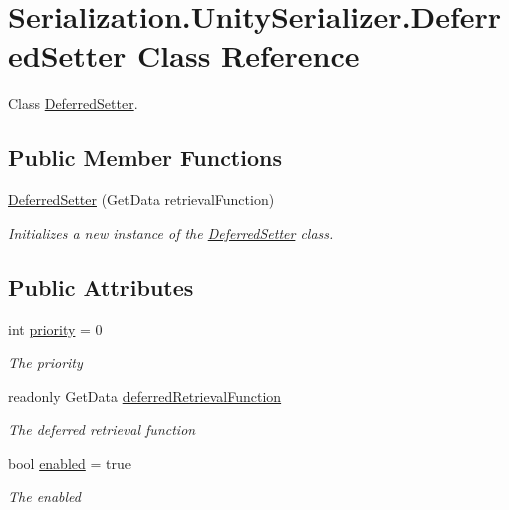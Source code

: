 \hypertarget{class_serialization_1_1_unity_serializer_1_1_deferred_setter}{}\section{Serialization.\+Unity\+Serializer.\+Deferred\+Setter Class Reference}
\label{class_serialization_1_1_unity_serializer_1_1_deferred_setter}


Class \hyperlink{class_serialization_1_1_unity_serializer_1_1_deferred_setter}{Deferred\+Setter}.  


\subsection*{Public Member Functions}
\begin{DoxyCompactItemize}
\item 
\hyperlink{class_serialization_1_1_unity_serializer_1_1_deferred_setter_a5a4ece5260d24868a8beb674ada150dd}{Deferred\+Setter} (Get\+Data retrieval\+Function)
\begin{DoxyCompactList}\small\item\em Initializes a new instance of the \hyperlink{class_serialization_1_1_unity_serializer_1_1_deferred_setter}{Deferred\+Setter} class. \end{DoxyCompactList}\end{DoxyCompactItemize}
\subsection*{Public Attributes}
\begin{DoxyCompactItemize}
\item 
int \hyperlink{class_serialization_1_1_unity_serializer_1_1_deferred_setter_ab5f7f3dd9252c8ec009307041c97f3c4}{priority} = 0
\begin{DoxyCompactList}\small\item\em The priority \end{DoxyCompactList}\item 
readonly Get\+Data \hyperlink{class_serialization_1_1_unity_serializer_1_1_deferred_setter_a94ee05c1cdd9b7569f15960446a37e88}{deferred\+Retrieval\+Function}
\begin{DoxyCompactList}\small\item\em The deferred retrieval function \end{DoxyCompactList}\item 
bool \hyperlink{class_serialization_1_1_unity_serializer_1_1_deferred_setter_a961e4fd57df2a9953490423766553f9f}{enabled} = true
\begin{DoxyCompactList}\small\item\em The enabled \end{DoxyCompactList}\end{DoxyCompactItemize}


